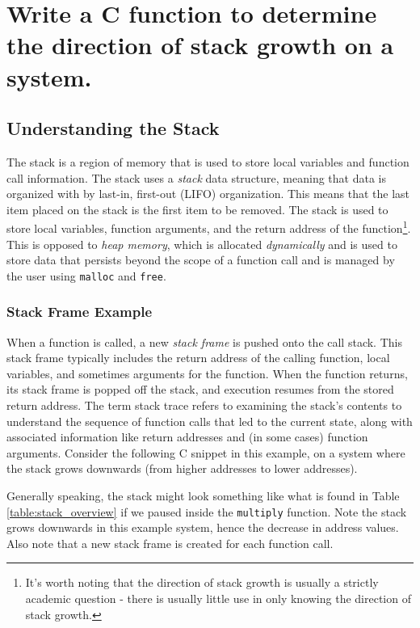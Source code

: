 \documentclass[main.tex]{subfiles}
\begin{document}
\section{Write a C function to determine the direction of stack growth on a system.}
\spoilerline

\subsection{Understanding the Stack}
The stack is a region of memory that is used to store local variables and function call information. The stack uses a \textit{stack} data structure, meaning that data is organized with by last-in, first-out (LIFO) organization. This means that the last item placed on the stack is the first item to be removed. The stack is used to store local variables, function arguments, and the return address of the function\footnote{It's worth noting that the direction of stack growth is usually a strictly academic question - there is usually little use in only knowing the direction of stack growth.}. This is opposed to \textit{heap memory}, which is allocated \textit{dynamically} and is used to store data that persists beyond the scope of a function call and is managed by the user using \texttt{malloc} and \texttt{free}.

\subsubsection{Stack Frame Example}
When a function is called, a new \textit{stack frame} is pushed onto the call stack. This stack frame typically includes the return address of the calling function, local variables, and sometimes arguments for the function. When the function returns, its stack frame is popped off the stack, and execution resumes from the stored return address. The term stack trace refers to examining the stack's contents to understand the sequence of function calls that led to the current state, along with associated information like return addresses and (in some cases) function arguments.
\newline
\newnoindentpara Consider the following C snippet in this example, on a system where the stack grows downwards (from higher addresses to lower addresses). 


\noindent Generally speaking, the stack might look something like what is found in Table \ref{table:stack_overview} if we paused inside the \texttt{multiply} function. Note the stack grows downwards in this example system, hence the decrease in address values. Also note that a new stack frame is created for each function call.
\end{document}

